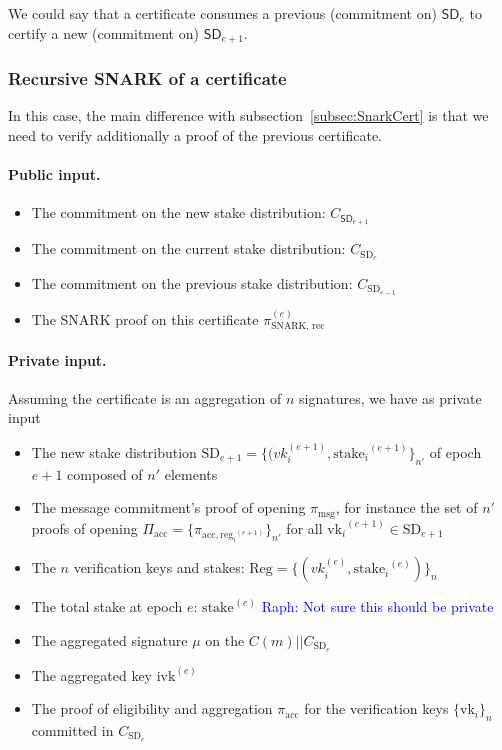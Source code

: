 \documentclass{article}
\newcommand{\vk}[1]{\ensuremath{\textrm{vk}_{#1}}\xspace}
\newcommand{\m}{\ensuremath{\textrm{msg}}\xspace}
\newcommand{\acc}{\ensuremath{\textrm{acc}}\xspace}
\newcommand{\reg}[1]{\ensuremath{\textrm{reg}_{#1}}\xspace}
\newcommand{\stake}[1]{\ensuremath{\textrm{stake}_{#1}}\xspace}
\newcommand{\ivk}{\ensuremath{\textrm{ivk}}\xspace}
\newcommand{\raph}[1]{\textcolor{blue}{Raph: #1}\xspace}
\begin{document}
We could say that a certificate consumes a previous (commitment on) $\textsf{SD}_{e}$ to certify a new (commitment on) $\textsf{SD}_{e+1}$.

%
\subsubsection{Recursive SNARK of a certificate}\label{subsub:RecSnarkCert}
In this case, the main difference with subsection~\ref{subsec:SnarkCert} is that we need to verify additionally a proof of the previous certificate.


\paragraph{Public input.}
\begin{itemize}
    \item The commitment on the new stake distribution: $C_{\textsf{SD}_{e+1}}$
    \item The commitment on the current stake distribution: $C_{\text{SD}_e}$
    \item The commitment on the previous stake distribution: $C_{\text{SD}_{e-1}}$
    \item The SNARK proof on this certificate $\pi_\text{SNARK, rec}^{(e)}$
\end{itemize}

\paragraph{Private input.}
Assuming the certificate is an aggregation of $n$ signatures, we have as private input

\begin{itemize}
    \item The new stake distribution $\text{SD}_{e+1} = \{ (vk_i^{(e+1)}, \stake{i}^{(e+1)} \}_{n'} $ of epoch $e+1$ composed of $n'$ elements
    \item The message commitment's proof of opening $\pi_\m$, for instance the set of $n'$ proofs of opening $\Pi_\acc = \{ \pi_{\acc, \reg{i}^{(e+1)}} \}_{n'}$  for all $\vk{i}^{(e+1)} \in \text{SD}_{e+1}$
    \item The $n$ verification keys and stakes: $\text{Reg} = \{ (vk_i^{(e)}, \stake{i}^{(e)} ) \}_n$
    \item The total stake at epoch $e$: $\stake{}^{(e)}$ \raph{Not sure this should be private}
    \item The aggregated signature $\mu$ on the $C(m) || C_{\text{SD}_e}$
    \item The aggregated key $\ivk^{(e)}$
    \item The proof of eligibility and aggregation $\pi_{\acc}$ for the verification keys $\{\vk{i}\}_n$ committed in $C_{\text{SD}_e}$
\end{itemize}
\end{document}
